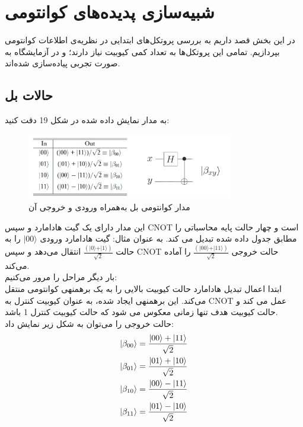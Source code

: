 \documentclass{book}
\begin{document}
\chapter{شبیه‌سازی پدیده‌های کوانتومی}
در این بخش قصد داریم به بررسی پروتکل‌های ابتدایی در نظریه‌ی اطلاعات کوانتومی بپردازیم. تمامی این پروتکل‌ها به تعداد کمی کیوبیت نیاز دارند؛ و در آزمایشگاه به صورت تجربی پیاده‌سازی شده‌اند. 
\section{حالات بل}
به مدار نمایش داده شده در شکل 19 دقت کنید:
\begin{figure}[h]
	\centering
	\includegraphics[width=0.8\textwidth]{Bell_state.png}
	\caption{مدار کوانتومی بل به‌همراه ورودی و خروجی آن}
\end{figure}


این مدار دارای یک گیت هادامارد و سپس CNOT است و چهار حالت پایه محاسباتی را مطابق جدول داده شده تبدیل می کند. به عنوان مثال:
 گیت هادامارد ورودی $\vert 00 \rangle$ را به حالت  $\frac{(\vert 0 \rangle + \vert 1 \rangle)}{\sqrt{2}}$ انتقال می‌دهد و سپس CNOT حالت خروجی $\frac{(\vert 00 \rangle + \vert 11 \rangle)}{\sqrt{2}}$ را آماده می‌کند.\\ 
 
 بار دیگر مراحل را مرور می‌کنیم:\\
  ابتدا اعمال تبدیل هادامارد حالت کیوبیت بالایی را به یک برهمنهی کوانتومی منتقل می‌کند. این برهمنهی ایجاد شده،‌ به عنوان کیوبیت کنترل به CNOT عمل می کند و حالت کیوبیت هدف تنها زمانی معکوس می شود که حالت کیوبیت کنترل 1 باشد.\\
  
  
حالت خروجی را می‌توان به شکل زیر نمایش داد:\\

\begin{equation}
	\begin{split}
		\ket{\beta_{00}} &= \frac{\ket{00} + \ket{11}}{\sqrt{2}} \\
		\ket{\beta_{01}} &= \frac{\ket{01} + \ket{10}}{\sqrt{2}} \\
		\ket{\beta_{10}} &= \frac{\ket{00} - \ket{11}}{\sqrt{2}} \\
		\ket{\beta_{11}} &= \frac{\ket{01} - \ket{10}}{\sqrt{2}}
	\end{split}	
\end{equation}
\end{document}
